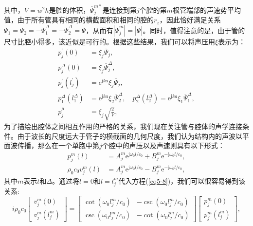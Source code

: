 其中，$V = w^2h$是腔的体积，$\overline{\Psi}_j^{m*}$是连接到第$j$个腔的第$m$根管端部的声速势平均值，由于所有管具有相同的横截面积和相同的腔的$r_z$，因此恰好满足关系$\overline{\Psi}_1 = \overline{\Psi}_2 = -\overline{\Psi}_1^{\Delta} = -\overline{\Psi}_2^{\Delta} = \overline{\Psi}$，从而有$|\overline{\Psi}_j^{m}| = |\overline{\Psi}|$。同时，值得注意的是，由于管的尺寸比腔小得多，该近似是可行的。根据这些结果，我们可以将声压用$\xi$表示为：
\begin{equation}
    \begin{split}
    p_j^{'}(0) & = \xi_j\overline{\Psi}_j, \\
    p_j^{\Delta}(0) & = \xi_j\overline{\Psi}_j^{\Delta}, \\
    p_j^{'}(l_j^{'}) & = \mathrm{e}^{\mathrm{j}ka} \xi_j\overline{\Psi}_j, \\
    p_1^{\Delta}(l_1^{\Delta}) & = \mathrm{e}^{\mathrm{j}ka} \xi_2\overline{\Psi}_2^{\Delta}, \quad p_2^{\Delta}(l_2^{\Delta}) = \mathrm{e}^{\mathrm{j}ka} \xi_1\overline{\Psi}_1^{\Delta}, \\
    p_j^{\mu} & = \xi_j\sqrt{\frac{2}{V}},
    \end{split}
    \label{eq5-8}
\end{equation}
为了描绘出腔体之间相互作用的严格的关系，我们现在关注管与腔体的声学连接条件。由于波长的尺度远大于管子的横截面的几何尺度，我们认为结构内的声波以平面波传播，那么在一个单胞中第$j$个腔中的声压以及声速则具有以下形式：
\begin{equation}
    \begin{split}
    p_j^m(l) &= A_j^m \mathrm{e}^{\mathrm{j}\omega_0 l / c_0} + B_j^m \mathrm{e}^{-\mathrm{j}\omega_0 l / c_0},\\
    \rho_0 c_0 v_j^m(l) &= A_j^m \mathrm{e}^{\mathrm{j}\omega_0 l / c_0} - B_j^m \mathrm{e}^{-\mathrm{j}\omega_0 l / c_0},
    \end{split}
    \label{eq5-9}
\end{equation}
其中$m$表示$t$和$\Delta$。通过将$l = 0$和$l = l_j^m$代入方程(\ref{eq5-8})，我们可以很容易得到该关系:
\begin{equation}\label{eq5-10}
    i\rho_0 c_0\begin{bmatrix}v_j^m(0)\\v_j^m(l_j^m)\end{bmatrix}=\begin{bmatrix}\cot(\omega_0 l_j^m / c_0)&-\csc(\omega_0 l_j^m / c_0)\\\csc(\omega_0 l_j^m / c_0)&-\cot(\omega_0 l_j^m / c_0)\end{bmatrix}\begin{bmatrix}p_j^m(0)\\p_j^m(l_j^m)\end{bmatrix},
\end{equation}
